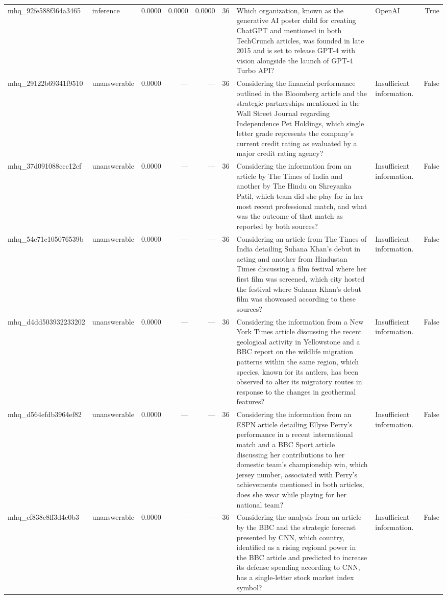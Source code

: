 \begin{tabular}{llrrrrllr}
mhq_92fe588f364a3465 & inference & 0.0000 & 0.0000 & 0.0000 & 36 & Which organization, known as the generative AI poster child for creating ChatGPT and mentioned in both TechCrunch articles, was founded in late 2015 and is set to release GPT-4 with vision alongside the launch of GPT-4 Turbo API? & OpenAI & True \\
mhq_29122b69341f9510 & unanswerable & 0.0000 & — & — & 36 & Considering the financial performance outlined in the Bloomberg article and the strategic partnerships mentioned in the Wall Street Journal regarding Independence Pet Holdings, which single letter grade represents the company's current credit rating as evaluated by a major credit rating agency? & Insufficient information. & False \\
mhq_37d091088ccc12cf & unanswerable & 0.0000 & — & — & 36 & Considering the information from an article by The Times of India and another by The Hindu on Shreyanka Patil, which team did she play for in her most recent professional match, and what was the outcome of that match as reported by both sources? & Insufficient information. & False \\
mhq_54c71c105076539b & unanswerable & 0.0000 & — & — & 36 & Considering an article from The Times of India detailing Suhana Khan's debut in acting and another from Hindustan Times discussing a film festival where her first film was screened, which city hosted the festival where Suhana Khan's debut film was showcased according to these sources? & Insufficient information. & False \\
mhq_d4dd503932233202 & unanswerable & 0.0000 & — & — & 36 & Considering the information from a New York Times article discussing the recent geological activity in Yellowstone and a BBC report on the wildlife migration patterns within the same region, which species, known for its antlers, has been observed to alter its migratory routes in response to the changes in geothermal features? & Insufficient information. & False \\
mhq_d564efdb3964ef82 & unanswerable & 0.0000 & — & — & 36 & Considering the information from an ESPN article detailing Ellyse Perry's performance in a recent international match and a BBC Sport article discussing her contributions to her domestic team's championship win, which jersey number, associated with Perry's achievements mentioned in both articles, does she wear while playing for her national team? & Insufficient information. & False \\
mhq_ef838c8ff3d4c0b3 & unanswerable & 0.0000 & — & — & 36 & Considering the analysis from an article by the BBC and the strategic forecast presented by CNN, which country, identified as a rising regional power in the BBC article and predicted to increase its defense spending according to CNN, has a single-letter stock market index symbol? & Insufficient information. & False \\
\bottomrule
\end{tabular}
